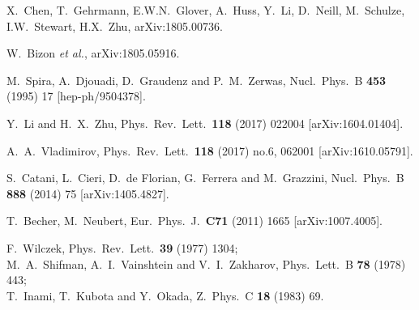 \documentclass[12pt]{article}
\begin{document}
\begin{thebibliography}{99}
  
X.~Chen, T.~Gehrmann, E.W.N.~Glover, A.~Huss, Y.~Li, D.~Neill, M.~Schulze, I.W.~Stewart, H.X.~Zhu,
  arXiv:1805.00736.

  W.~Bizon {\it et al.},
  arXiv:1805.05916.

  

  M.~Spira, A.~Djouadi, D.~Graudenz and P.~M.~Zerwas,
  Nucl.\ Phys.\ B {\bf 453} (1995) 17
  [hep-ph/9504378].

  Y.~Li and H.~X.~Zhu,
  Phys.\ Rev.\ Lett.\  {\bf 118} (2017)  022004
   [arXiv:1604.01404].
  
  A.~A.~Vladimirov,
  Phys.\ Rev.\ Lett.\  {\bf 118} (2017) no.6,  062001
   [arXiv:1610.05791].
  
  S.~Catani, L.~Cieri, D.~de Florian, G.~Ferrera and M.~Grazzini,
  Nucl.\ Phys.\ B {\bf 888} (2014) 75
  [arXiv:1405.4827].
  

  T.~Becher, M.~Neubert,
  Eur.\ Phys.\ J.\  {\bf C71 } (2011)  1665
[arXiv:1007.4005].


  F.~Wilczek,
  Phys.\ Rev.\ Lett.\  {\bf 39} (1977) 1304;\\
 M.~A.~Shifman, A.~I.~Vainshtein and V.~I.~Zakharov,
  Phys.\ Lett.\ B {\bf 78} (1978) 443;\\
  T.~Inami, T.~Kubota and Y.~Okada,
  Z.\ Phys.\ C {\bf 18} (1983) 69.


\end{thebibliography}
\end{document}
